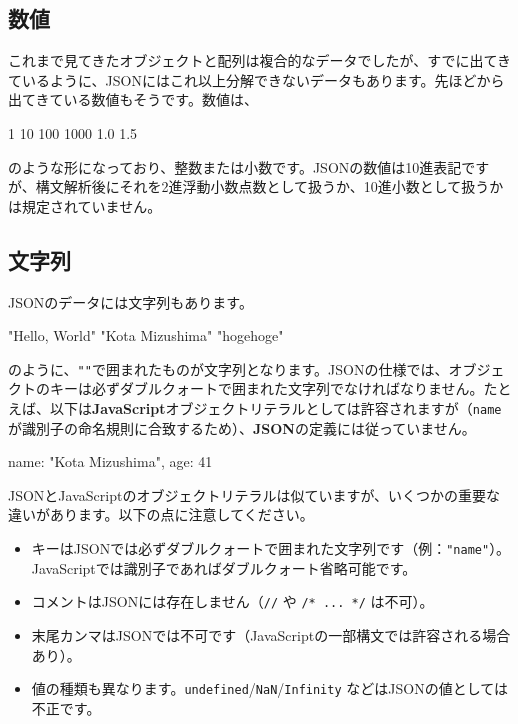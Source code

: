 \subsection{数値}

これまで見てきたオブジェクトと配列は複合的なデータでしたが、すでに出てきているように、JSONにはこれ以上分解できないデータもあります。先ほどから出てきている数値もそうです。数値は、

\begin{codescreen}{}
1
10
100
1000
1.0
1.5
\end{codescreen}

\noindent のような形になっており、整数または小数です。JSONの数値は10進表記ですが、構文解析後にそれを2進浮動小数点数として扱うか、10進小数として扱うかは規定されていません。

\subsection{文字列}

JSONのデータには文字列もあります。

\begin{codescreen}{}
"Hello, World"
"Kota Mizushima"
"hogehoge"
\end{codescreen}

\noindent \enlargethispage{2\baselineskip}のように、\texttt{""}で囲まれたものが文字列となります。JSONの仕様では、オブジェクトのキーは必ずダブルクォートで囲まれた文字列でなければなりません。たとえば、以下は\textbf{\sffamily JavaScript}オブジェクトリテラルとしては許容されますが（\texttt{name}
が識別子の命名規則に合致するため）、\textbf{\sffamily JSON}の定義には従っていません。

\begin{codescreen}{}
{
  name: "Kota Mizushima",
  age:  41
}
\end{codescreen}

\begin{tcolorbox}[breakable,title=JSONとJavaScriptオブジェクトの違い]
JSONとJavaScriptのオブジェクトリテラルは似ていますが、いくつかの重要な違いがあります。以下の点に注意してください。

\begin{itemize}
\item
  キーはJSONでは必ずダブルクォートで囲まれた文字列です（例：\texttt{"name"}）。JavaScriptでは識別子であればダブルクォート省略可能です。
\item
  コメントはJSONには存在しません（\texttt{//} や \texttt{/*\ ...\ */}
  は不可）。
\item
  末尾カンマはJSONでは不可です（JavaScriptの一部構文では許容される場合あり）。
\item
  値の種類も異なります。\texttt{undefined}/\texttt{NaN}/\texttt{Infinity}
  などはJSONの値としては不正です。
\end{itemize}
\end{tcolorbox}

